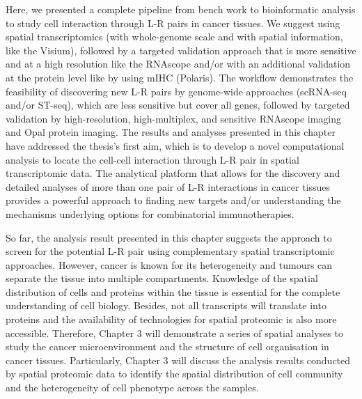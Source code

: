 Here, we presented a complete pipeline from bench work to bioinformatic analysis to study cell interaction through L-R pairs in cancer tissues. We suggest using spatial transcriptomics (with whole-genome scale and with spatial information, like the Visium), followed by a targeted validation approach that is more sensitive and at a high resolution like the RNAscope and/or with an additional validation at the protein level like by using mIHC (\ie Polaris). The workflow demonstrates the feasibility of discovering new L-R pairs by genome-wide approaches (scRNA-seq and/or ST-seq), which are less sensitive but cover all genes, followed by targeted validation by high-resolution, high-multiplex, and sensitive RNAscope imaging and Opal protein imaging. The results and analyses presented in this chapter have addressed the thesis's first aim, which is to develop a novel computational analysis to locate the cell-cell interaction through L-R pair in spatial transcriptomic data.  The analytical platform that allows for the discovery and detailed analyses of more than one pair of L-R interactions in cancer tissues provides a powerful approach to finding new targets and/or understanding the mechanisms underlying options for combinatorial immunotherapies. 

So far, the analysis result presented in this chapter suggests the approach to screen for the potential L-R pair using complementary spatial transcriptomic approaches.  However, cancer is known for its heterogeneity and tumours can separate the tissue into multiple compartments. Knowledge of the spatial distribution of cells and proteins within the tissue is essential for the complete understanding of cell biology. Besides, not all transcripts will translate into proteins and the availability of technologies for spatial proteomic is also more accessible. Therefore, Chapter 3 will demonstrate a series of spatial analyses to study the cancer microenvironment and the structure of cell organisation in cancer tissues.  Particularly, Chapter 3 will discuss the analysis results conducted by spatial proteomic data to identify the spatial distribution of cell community and the heterogeneity of cell phenotype across the samples. 






\typeout{}

% 

% 